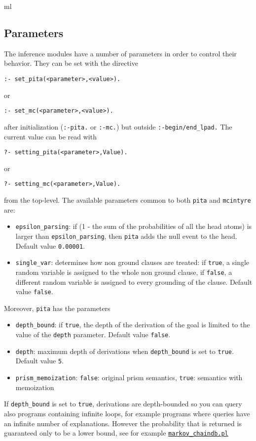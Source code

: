 ml\subsection{Parameters}
The inference modules have a number of parameters in order to control their behavior. They can be set with the directive
\begin{verbatim}
:- set_pita(<parameter>,<value>).
\end{verbatim}
or
\begin{verbatim}
:- set_mc(<parameter>,<value>).
\end{verbatim}
after initialization (\verb|:-pita.| or \verb|:-mc.|) but outside \verb|:-begin/end_lpad.|
The current value can be read with
\begin{verbatim}
?- setting_pita(<parameter>,Value).
\end{verbatim}
or
\begin{verbatim}
?- setting_mc(<parameter>,Value).
\end{verbatim}
from the top-level.
The available parameters common to both \verb|pita| and \verb|mcintyre| are:
\begin{itemize}
\item 
	 \verb|epsilon_parsing|: if (1 - the sum of the probabilities of all the head atoms) is larger than 
    \verb|epsilon_parsing|,
		then \texttt{pita} adds the null event to the head. Default value \texttt{0.00001}.
\item \verb|single_var|: determines how non ground clauses are treated: if \texttt{true}, a single random variable is assigned to the whole non ground clause, 
if \texttt{false}, a different random variable is assigned to every grounding of the clause. Default value \texttt{false}.
\end{itemize}
Moreover, \verb|pita| has the parameters
\begin{itemize}
\item \verb|depth_bound|: if \texttt{true}, the depth of the derivation of the goal is limited to the value of the \texttt{depth} parameter.  Default value \texttt{false}.
\item  \texttt{depth}: maximum depth of derivations when  \verb|depth_bound| is set to \texttt{true}. Default value \texttt{5}.
\item \verb|prism_memoization|: \verb|false|: original prism semantics, \verb|true|: semantics with memoization
\end{itemize}
If \verb|depth_bound| is set to \verb|true|, derivations are depth-bounded so you can query also programs
containing infinite loops, for example programs where queries have an infinite number of explanations. However the probability that is returned is guaranteed only to be a lower bound,
see for example \href{http://cplint.eu/e/markov_chaindb.pl}{\texttt{markov\_chaindb.pl}}

